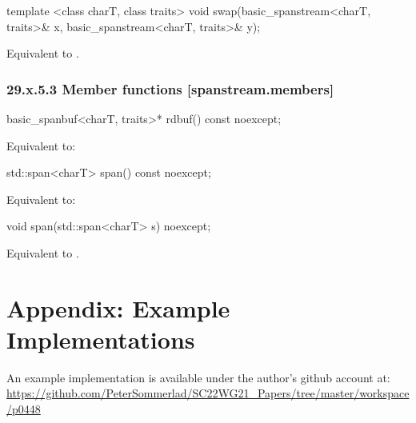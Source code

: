 \documentclass[ebook,11pt,article]{memoir}
\begin{document}
\begin{itemdecl}
template <class charT, class traits>
  void swap(basic_spanstream<charT, traits>& x,
            basic_spanstream<charT, traits>& y);
\end{itemdecl}

\begin{itemdescr}
\pnum
\effects Equivalent to .
\end{itemdescr}

\subsection{29.x.5.3 Member functions [spanstream.members]}
\label{spanstream.members}

\begin{itemdecl}
basic_spanbuf<charT, traits>* rdbuf() const noexcept;
\end{itemdecl}

\begin{itemdescr}
\pnum
\effects Equivalent to: \\
\end{itemdescr}

\begin{itemdecl}
std::span<charT> span() const noexcept;
\end{itemdecl}

\begin{itemdescr}
\pnum
\effects Equivalent to: \\
\end{itemdescr}

\begin{itemdecl}
void span(std::span<charT> s) noexcept;
\end{itemdecl}

\begin{itemdescr}
\pnum
\effects
Equivalent to
.
\end{itemdescr}



\chapter{Appendix: Example Implementations}
An example implementation is available under the author's github account at:
\url{https://github.com/PeterSommerlad/SC22WG21_Papers/tree/master/workspace/p0448}
\end{document}
